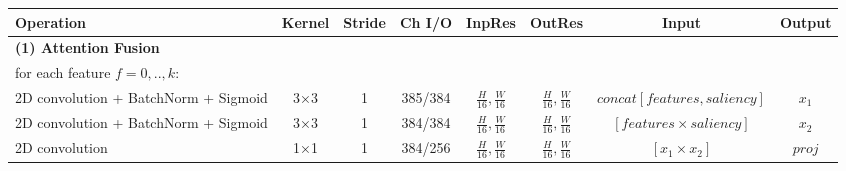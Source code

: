 \begin{table}[htbp]
\scriptsize
\centering
\begin{adjustbox}{width=1\textwidth}
\def\arraystretch{1.75}
\begin{tabular}{|l|c|c|c|c|c|c|c|}
\hline
\rowcolor{bgcolor}
\textbf{Operation}                     & \textbf{Kernel} & \textbf{Stride} & \textbf{Ch I/O} & \textbf{InpRes} & \textbf{OutRes} & \textbf{Input}     & \textbf{Output} \\ \hline
\hline
\rowcolor{bgcolor}
\textbf{(1) Attention Fusion}           &                 &                 &                 &                 &                 &                    &                 \\ \hline
for each feature $f = 0, .., k:$            &                 &                 &                 &                 &                 &                    &                 \\ \hline

\hspace{0.75cm}2D convolution + BatchNorm + Sigmoid                    & 3×3             & 1               & 385/384            &      \(\frac{H}{16}, \frac{W}{16}\)    & \(\frac{H}{16}, \frac{W}{16}\)          & $concat[features, saliency]$          & $x_1$          \\ \hline
\hspace{0.75cm}2D convolution + BatchNorm + Sigmoid                           & 3×3             & 1               & 384/384            &  \(\frac{H}{16}, \frac{W}{16}\)  &  \(\frac{H}{16}, \frac{W}{16}\)         &   $[features \times saliency]$         & $x_2$          \\ \hline
\hspace{0.75cm}2D convolution                            & 1×1             & 1               & 384/256          & \(\frac{H}{16}, \frac{W}{16}\)         & \(\frac{H}{16}, \frac{W}{16}\)         &  $[x_1 \times x_2]$           &  $proj$          \\ \hline


\end{tabular}
\end{adjustbox}
\end{table}
